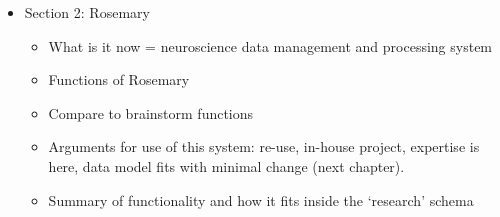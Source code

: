 \begin{itemize}
	\item Section 2: Rosemary
		\begin{itemize}
			\item What is it now = neuroscience data management and processing system
			\item Functions of Rosemary
			\item Compare to brainstorm functions
			\item Arguments for use of this system: re-use, in-house project, expertise is here, data model fits with minimal change (next chapter).
			\item Summary of functionality and how it fits inside the `research' schema
		\end{itemize}
\end{itemize}